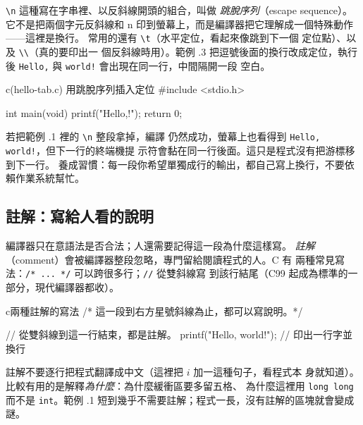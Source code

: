 \texttt{\textbackslash n} 這種寫在字串裡、以反斜線開頭的組合，叫做
\emph{跳脫序列}（escape sequence）。它不是把兩個字元反斜線和
n 印到螢幕上，而是編譯器把它理解成一個特殊動作——這裡是換行。
常用的還有 \texttt{\textbackslash t}（水平定位，看起來像跳到下一個
定位點）、以及 \texttt{\textbackslash\textbackslash}（真的要印出一
個反斜線時用）。範例 \thechapter.3 把逗號後面的換行改成定位，執行
後 \texttt{Hello,} 與 \texttt{world!} 會出現在同一行，中間隔開一段
空白。

\begin{example}{c}{(hello-tab.c) 用跳脫序列插入定位}
#include <stdio.h>

int main(void) {
    printf("Hello,\tworld!\n");
    return 0;
}
\end{example}


若把範例 \thechapter.1 裡的 \texttt{\textbackslash n} 整段拿掉，編譯
仍然成功，螢幕上也看得到 \texttt{Hello, world!}，但下一行的終端機提
示符會黏在同一行後面。這只是程式沒有把游標移到下一行。
養成習慣：每一段你希望單獨成行的輸出，都自己寫上換行，不要依
賴作業系統幫忙。


\subsection{註解：寫給人看的說明}

編譯器只在意語法是否合法；人還需要記得這一段為什麼這樣寫。
\emph{註解}（comment）會被編譯器整段忽略，專門留給閱讀程式的人。C 有
兩種常見寫法：\texttt{/* ... */} 可以跨很多行；\texttt{//} 從雙斜線寫
到該行結尾（C99 起成為標準的一部分，現代編譯器都收）。

\begin{code}{c}{兩種註解的寫法}
/* 這一段到右方星號斜線為止，都可以寫說明。*/

// 從雙斜線到這一行結束，都是註解。
printf("Hello, world!\n");  // 印出一行字並換行
\end{code}

註解不要逐行把程式翻譯成中文（這裡把 $i$ 加一這種句子，看程式本
身就知道）。比較有用的是解釋\emph{為什麼}：為什麼緩衝區要多留五格、
為什麼這裡用 \texttt{long long} 而不是 \texttt{int}。範例
\thechapter.1 短到幾乎不需要註解；程式一長，沒有註解的區塊就會變成謎。

